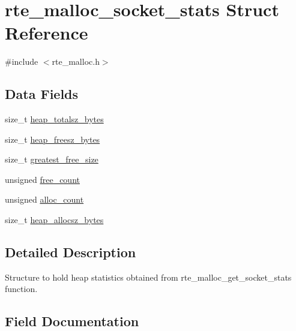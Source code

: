 \hypertarget{structrte__malloc__socket__stats}{}\section{rte\+\_\+malloc\+\_\+socket\+\_\+stats Struct Reference}
\label{structrte__malloc__socket__stats}


{\ttfamily \#include $<$rte\+\_\+malloc.\+h$>$}

\subsection*{Data Fields}
\begin{DoxyCompactItemize}
\item 
size\+\_\+t \hyperlink{structrte__malloc__socket__stats_ad7e076b5351846ea603a6618b5636bcf}{heap\+\_\+totalsz\+\_\+bytes}
\item 
size\+\_\+t \hyperlink{structrte__malloc__socket__stats_af21563aaa4e77ce700303f35a677fcd6}{heap\+\_\+freesz\+\_\+bytes}
\item 
size\+\_\+t \hyperlink{structrte__malloc__socket__stats_af0c07d07c76c798c06f67076f3d6ea06}{greatest\+\_\+free\+\_\+size}
\item 
unsigned \hyperlink{structrte__malloc__socket__stats_ab926bef5b6bf573ff430b6bebd9fc03b}{free\+\_\+count}
\item 
unsigned \hyperlink{structrte__malloc__socket__stats_add2e070a971f0beea2e1f41e59363064}{alloc\+\_\+count}
\item 
size\+\_\+t \hyperlink{structrte__malloc__socket__stats_a6c9d0889a9a63658a297ab5deef59ba7}{heap\+\_\+allocsz\+\_\+bytes}
\end{DoxyCompactItemize}


\subsection{Detailed Description}
Structure to hold heap statistics obtained from rte\+\_\+malloc\+\_\+get\+\_\+socket\+\_\+stats function. 

\subsection{Field Documentation}
\hypertarget{structrte__malloc__socket__stats_add2e070a971f0beea2e1f41e59363064}{}

